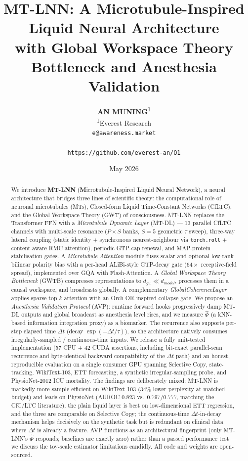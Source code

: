 \documentclass[11pt]{article}
\title{
  \textbf{MT-LNN: A Microtubule-Inspired Liquid Neural Architecture\\
  with Global Workspace Theory Bottleneck and Anesthesia Validation}
}
\author{
  \textbf{AN MUNING}\textsuperscript{1} \\
  \textsuperscript{1}Everest Research \\
  \texttt{e@awareness.market} \\
  \vspace{0.2cm} \\
  \texttt{https://github.com/everest-an/O1}
}
\date{May 2026}
\theoremstyle{definition}
\newcommand{\phihat}{\hat{\Phi}}
\begin{document}
\maketitle

\begin{abstract}
We introduce \textbf{MT-LNN} (\textbf{M}icro\textbf{t}ubule-Inspired \textbf{L}iquid \textbf{N}eural \textbf{N}etwork), a neural architecture that bridges three lines of scientific theory: the computational role of neuronal microtubules (MTs), Closed-form Liquid Time-Constant Networks (CfLTC), and the Global Workspace Theory (GWT) of consciousness. MT-LNN replaces the Transformer FFN with a \emph{Microtubule Dynamic Layer} (MT-DL) — 13 parallel CfLTC channels with multi-scale resonance ($P \times S$ banks, $S=5$ geometric $\tau$ sweep), three-way lateral coupling (static identity + synchronous nearest-neighbour via \texttt{torch.roll} + content-aware RMC attention), periodic GTP-cap renewal, and MAP-protein stabilisation gates. A \emph{Microtubule Attention} module fuses scalar and optional low-rank bilinear polarity bias with a per-head ALiBi-style GTP-decay gate ($64\times$ receptive-field spread), implemented over GQA with Flash-Attention. A \emph{Global Workspace Theory Bottleneck} (GWTB) compresses representations to $d_{gw} \ll d_{model}$, processes them in a causal workspace, and broadcasts globally. A complementary \emph{GlobalCoherenceLayer} applies sparse top-$k$ attention with an Orch-OR-inspired collapse gate. We propose an \emph{Anesthesia Validation Protocol} (AVP): runtime forward hooks progressively damp MT-DL outputs and global broadcast as anesthesia level rises, and we measure $\phihat$ (a kNN-based information integration proxy) as a biomarker. The recurrence also supports per-step elapsed time $\Delta t$ (decay $\exp(-\Delta t/\tau)$), so the architecture natively consumes irregularly-sampled / continuous-time inputs. We release a fully unit-tested implementation (57 CPU + 42 CUDA assertions, including bit-exact parallel-scan recurrence and byte-identical backward compatibility of the $\Delta t$ path) and an honest, reproducible evaluation on a single consumer GPU spanning Selective Copy, state-tracking, WikiText-103, ETT forecasting, a synthetic irregular-sampling probe, and PhysioNet-2012 ICU mortality. The findings are deliberately mixed: MT-LNN is markedly more sample-efficient on WikiText-103 (34\% lower perplexity at matched budget) and leads on PhysioNet (AUROC 0.823 vs.\ 0.797/0.777, matching the CfC/LTC literature), the plain liquid layer is best on low-dimensional ETT regression, and the three are comparable on Selective Copy; the continuous-time $\Delta t$-in-decay mechanism helps decisively on the synthetic task but is redundant on clinical data where $\Delta t$ is already a feature. AVP functions as an architectural fingerprint (only MT-LNN's $\hat{\Phi}$ responds; baselines are exactly zero) rather than a passed performance test — we discuss the toy-scale estimator limitations candidly. All code and weights are open-sourced.


\end{abstract}
\end{document}
